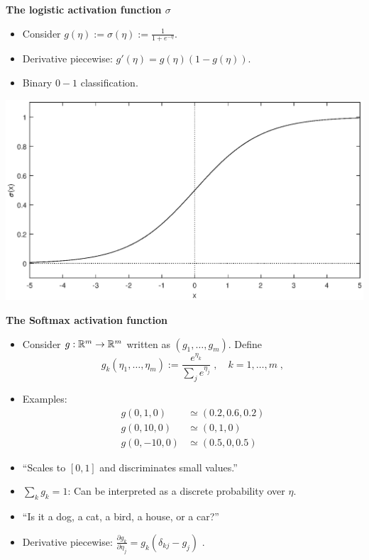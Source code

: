\documentclass[10pt,hyperref={pdfpagelabels=false}]{beamer}
\begin{document}
\begin{frame}[allowframebreaks]
    {\large{\bf The logistic activation function $\sigma$}}

    \begin{itemize}
        \item Consider $g(\eta):=\sigma(\eta):= \frac{1}{1+e^{-\eta}}$.
        \item Derivative piecewise: $g'(\eta) = g(\eta)(1-g(\eta))$.
        \item Binary $0-1$ classification.
    \end{itemize}
    \centering\includegraphics[width=.7\textwidth]{figures/sigmoid.eps}
    \framebreak

    {\large{\bf The Softmax activation function}}

    \begin{itemize}
        \item Consider $g: \mathbb{R}^m\to \mathbb{R}^m$ written as $(g_1, \dots, g_m)$. Define
        $$
            g_k(\eta_1, \dots, \eta_m) := \frac{e^{\eta_k}}{\sum_je^{\eta_j}}
            \;,\quad k=1,\dots,m
            \;,
        $$
        \item Examples:
            \begin{equation*}
                \begin{split}
                    g(0,1,0)&\simeq(0.2, 0.6, 0.2)\\
                    g(0,10,0)&\simeq(0, 1, 0)\\
                    g(0,-10,0)&\simeq(0.5, 0, 0.5)
                \end{split}
            \end{equation*}
        \item ``Scales to $[0,1]$ and discriminates small values.''
        \item $\sum_k g_k=1$: Can be interpreted as a discrete probability over $\eta$.
        \item ``Is it a dog, a cat, a bird, a house, or a car?''
        \item Derivative piecewise: $\frac{\partial g_k}{\partial \eta_j} = g_k(\delta_{kj}-g_j)$ .
    \end{itemize}
\end{frame}
\end{document}

